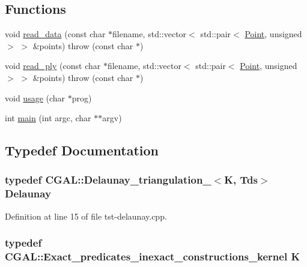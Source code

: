 \subsection*{Functions}
\begin{DoxyCompactItemize}
\item 
void \hyperlink{tst-delaunay_8cpp_a46e50ae2d9d8049dd03c290d2cf89cc7}{read\_\-data} (const char $\ast$filename, std::vector$<$ std::pair$<$ \hyperlink{tst__info_8cpp_aa5acf70a1c48c8f9446423f5522abeb8}{Point}, unsigned $>$ $>$ \&points)  throw (const char $\ast$)
\item 
void \hyperlink{tst-delaunay_8cpp_aaa57925527b5ce7c4bb1d6d94b943c85}{read\_\-ply} (const char $\ast$filename, std::vector$<$ std::pair$<$ \hyperlink{tst__info_8cpp_aa5acf70a1c48c8f9446423f5522abeb8}{Point}, unsigned $>$ $>$ \&points)  throw (const char $\ast$)
\item 
void \hyperlink{tst-delaunay_8cpp_aa4817482b1728bf62acf8030cab9842c}{usage} (char $\ast$prog)
\item 
int \hyperlink{tst-delaunay_8cpp_a3c04138a5bfe5d72780bb7e82a18e627}{main} (int argc, char $\ast$$\ast$argv)
\end{DoxyCompactItemize}


\subsection{Typedef Documentation}
\hypertarget{tst-delaunay_8cpp_aaca765768a8bc0aed856b44d4f9e10e2}{
\subsubsection[{Delaunay}]{\setlength{\rightskip}{0pt plus 5cm}typedef CGAL::Delaunay\_\-triangulation\_$<${\bf K}, {\bf Tds}$>$ {\bf Delaunay}}}
\label{tst-delaunay_8cpp_aaca765768a8bc0aed856b44d4f9e10e2}


Definition at line 15 of file tst-\/delaunay.cpp.

\hypertarget{tst-delaunay_8cpp_a891e241aa245ae63618f03737efba309}{
\subsubsection[{K}]{\setlength{\rightskip}{0pt plus 5cm}typedef CGAL::Exact\_\-predicates\_\-inexact\_\-constructions\_\-kernel {\bf K}}}
\label{tst-delaunay_8cpp_a891e241aa245ae63618f03737efba309}


